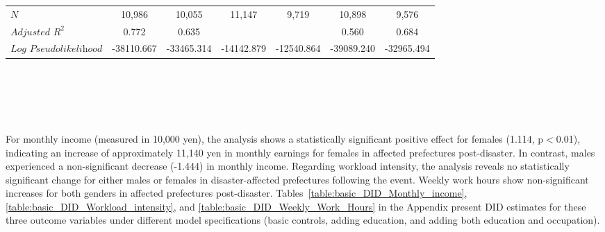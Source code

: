 \documentclass[a4paper,12pt]{article}
\begin{document}
\begin{table}[htbp]
{\begin{tabular}{@{}l*{6}{c}@{}}
$\textit{N}$&   10,986         &   10,055         &   11,147         &    9,719         &   10,898         &    9,576         \\
$\textit{Adjusted R}^2$&    0.772         &    0.635         &                  &                  &    0.560         &    0.684         \\
$\textit{Log Pseudolikelihood}$&-38110.667         &-33465.314         &-14142.879         &-12540.864         &-39089.240         &-32965.494         \\
\bottomrule
\end{tabular}}
\\\\
\\
\\

\label{table:basic_DID}


\end{table}


For monthly income (measured in 10,000 yen), the analysis shows a statistically significant positive effect for females (1.114, p$<$0.01), indicating an increase of approximately 11,140 yen in monthly earnings for females in affected prefectures post-disaster. In contrast, males experienced a non-significant decrease (-1.444) in monthly income. Regarding workload intensity, the analysis reveals no statistically significant change for either males or females in disaster-affected prefectures following the event. Weekly work hours show non-significant increases for both genders in affected prefectures post-disaster. Tables~\ref{table:basic_DID_Monthly_income}, \ref{table:basic_DID_Workload_intensity}, and \ref{table:basic_DID_Weekly_Work_Hours} in the Appendix present DID estimates for these three outcome variables under different model specifications (basic controls, adding education, and adding both education and occupation).
\end{document}

